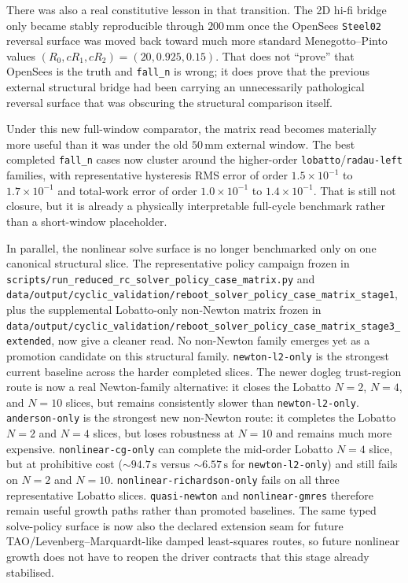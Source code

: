 There was also a real constitutive lesson in that transition.  The 2D hi-fi
bridge only became stably reproducible through \(200\,\mathrm{mm}\) once the
OpenSees \texttt{Steel02} reversal surface was moved back toward much more
standard Menegotto--Pinto values
\((R_0,cR_1,cR_2)=(20,0.925,0.15)\).  That does not ``prove'' that OpenSees is
the truth and \texttt{fall\_n} is wrong; it does prove that the previous
external structural bridge had been carrying an unnecessarily pathological
reversal surface that was obscuring the structural comparison itself.

Under this new full-window comparator, the matrix read becomes materially more
useful than it was under the old \(50\,\mathrm{mm}\) external window.  The
best completed \texttt{fall\_n} cases now cluster around the higher-order
\texttt{lobatto}/\texttt{radau-left} families, with representative hysteresis
RMS error of order \(1.5\times10^{-1}\) to \(1.7\times10^{-1}\) and total-work
error of order \(1.0\times10^{-1}\) to \(1.4\times10^{-1}\).  That is still
not closure, but it is already a physically interpretable full-cycle benchmark
rather than a short-window placeholder.

In parallel, the nonlinear solve surface is no longer benchmarked only on one
canonical structural slice.  The representative policy campaign frozen in
\texttt{scripts/run\_reduced\_rc\_solver\_policy\_case\_matrix.py} and
\texttt{data/output/cyclic\_validation/reboot\_solver\_policy\_case\_matrix\_stage1},
plus the supplemental Lobatto-only non-Newton matrix frozen in
\texttt{data/output/cyclic\_validation/reboot\_solver\_policy\_case\_matrix\_stage3\_extended},
now give a cleaner read.  No non-Newton family emerges yet as a promotion
candidate on this structural family.  \texttt{newton-l2-only} is the strongest
current baseline across the harder completed slices.  The newer dogleg
trust-region route is now a real Newton-family alternative: it closes the
Lobatto \(N=2\), \(N=4\), and \(N=10\) slices, but remains consistently slower
than \texttt{newton-l2-only}.  \texttt{anderson-only} is the strongest new
non-Newton route: it completes the Lobatto \(N=2\) and \(N=4\) slices, but
loses robustness at \(N=10\) and remains much more expensive.
\texttt{nonlinear-cg-only} can complete the mid-order Lobatto \(N=4\) slice,
but at prohibitive cost (\(\sim94.7\,\mathrm{s}\) versus
\(\sim6.57\,\mathrm{s}\) for \texttt{newton-l2-only}) and still fails on
\(N=2\) and \(N=10\).  \texttt{nonlinear-richardson-only} fails on all three
representative Lobatto slices.  \texttt{quasi-newton} and
\texttt{nonlinear-gmres} therefore remain useful growth paths rather than
promoted baselines.  The same typed solve-policy surface is now also the
declared extension seam for future TAO/Levenberg--Marquardt-like damped
least-squares routes, so future nonlinear growth does not have to reopen the
driver contracts that this stage already stabilised.


